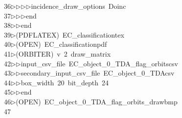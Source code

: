\begin{tabbing}
36\>$\triangleright$\>$\triangleright$\>$\triangleright$\>$\triangleright$\>incidence\_draw\_options\ Doinc\ \\[0pt]
37\>$\triangleright$\>$\triangleright$\>$\triangleright$\>end\ \\[0pt]
38\>$\triangleright$\>$\triangleright$\>end\\[0pt]
39\>$\triangleright$\>(PDFLATEX)\ EC\_classificationtex\\[0pt]
40\>$\triangleright$\>(OPEN)\ EC\_classificationpdf\\[0pt]
41\>$\triangleright$\>(ORBITER)\ v\ 2\ draw\_matrix\ \\[0pt]
42\>$\triangleright$\>$\triangleright$\>input\_csv\_file\ EC\_object\_0\_TDA\_flag\_orbitscsv\ \\[0pt]
43\>$\triangleright$\>$\triangleright$\>secondary\_input\_csv\_file\ EC\_object\_0\_TDAcsv\ \\[0pt]
44\>$\triangleright$\>$\triangleright$\>box\_width\ 20\ bit\_depth\ 24\ \\[0pt]
45\>$\triangleright$\>$\triangleright$\>end\\[0pt]
46\>$\triangleright$\>(OPEN)\ EC\_object\_0\_TDA\_flag\_orbits\_drawbmp\\[0pt]
47\>\end{tabbing}
